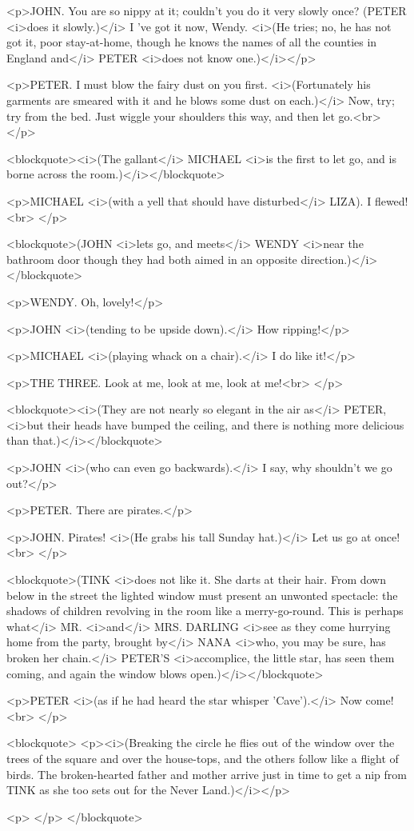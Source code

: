 <p>JOHN. You are so nippy at it; couldn't you do it very slowly once?
(PETER <i>does it slowly.)</i> I 've got it now, Wendy. <i>(He tries;
no, he has not got it, poor stay-at-home, though he knows the names
of all the counties in England and</i> PETER <i>does not know
one.)</i></p>

<p>PETER. I must blow the fairy dust on you first. <i>(Fortunately
his garments are smeared with it and he blows some dust on each.)</i>
Now, try; try from the bed. Just wiggle your shoulders this way, and
then let go.<br>
</p>

<blockquote><i>(The gallant</i> MICHAEL <i>is the first to let go,
and is borne across the room.)</i></blockquote>

<p>MICHAEL <i>(with a yell that should have disturbed</i> LIZA). I
flewed!<br>
</p>

<blockquote>(JOHN <i>lets go, and meets</i> WENDY <i>near the
bathroom door though they had both aimed in an opposite
direction.)</i></blockquote>

<p>WENDY. Oh, lovely!</p>

<p>JOHN <i>(tending to be upside down).</i> How ripping!</p>

<p>MICHAEL <i>(playing whack on a chair).</i> I do like it!</p>

<p>THE THREE. Look at me, look at me, look at me!<br>
</p>

<blockquote><i>(They are not nearly so elegant in the air as</i>
PETER, <i>but their heads have bumped the ceiling, and there is
nothing more delicious than that.)</i></blockquote>

<p>JOHN <i>(who can even go backwards).</i> I say, why shouldn't we
go out?</p>

<p>PETER. There are pirates.</p>

<p>JOHN. Pirates! <i>(He grabs his tall Sunday hat.)</i> Let us go at
once!<br>
</p>

<blockquote>(TINK <i>does not like it. She darts at their hair. From
down below in the street the lighted window must present an unwonted
spectacle: the shadows of children revolving in the room like a
merry-go-round. This is perhaps what</i> MR. <i>and</i> MRS. DARLING
<i>see as they come hurrying home from the party, brought by</i> NANA
<i>who, you may be sure, has broken her chain.</i> PETER'S
<i>accomplice, the little star, has seen them coming, and again the
window blows open.)</i></blockquote>

<p>PETER <i>(as if he had heard the star whisper 'Cave').</i> Now
come!<br>
</p>

<blockquote>
<p><i>(Breaking the circle he flies out of the window over the trees
of the square and over the house-tops, and the others follow like a
flight of birds. The broken-hearted father and mother arrive just in
time to get a nip from TINK as she too sets out for the Never
Land.)</i></p>

<p> </p>
</blockquote>
